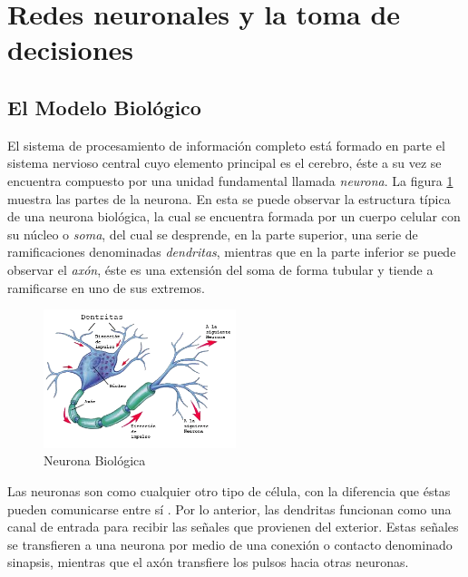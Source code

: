 \section{Redes neuronales y la toma de decisiones}
\subsection{El Modelo Biol\'{o}gico}
 
 		El sistema de procesamiento de informaci\'{o}n completo est\'{a} formado en parte el
 	sistema nervioso central cuyo elemento principal es el cerebro, \'{e}ste a su
 	vez se encuentra compuesto por una unidad fundamental llamada \textit{neurona}.
 	\cite{Kriesel2005} La figura \ref{fig:neuronaBio} muestra las partes de la
 	neurona. En esta se puede observar la estructura t\'{i}pica de una neurona biol\'{o}gica, la
 	cual se encuentra formada por un cuerpo celular con su n\'{u}cleo o
 	\textit{soma}, del cual se desprende, en la parte superior, una serie de
 	ramificaciones denominadas \textit{dendritas}, mientras que en la parte
 	inferior se puede observar el \textit{ax\'{o}n}, \'{e}ste es una extensi\'{o}n del soma de forma tubular y
 	tiende a ramificarse en uno de sus extremos.
 	
 	\begin{figure}[htp]
 		\centering
 		\includegraphics[width=0.5\textwidth]{images/TesisYGR-neuron.png}
 		\caption{Neurona Biol\'{o}gica}
 		\label{fig:neuronaBio}
 	\end{figure}
 	
 	 		Las neuronas son como cualquier otro tipo de c\'{e}lula, con la diferencia que
 	\'{e}stas pueden comunicarse entre s\'{i} \cite{Longo2011}. Por lo anterior, las dendritas
 	funcionan como una canal de entrada para recibir las se\~{n}ales que provienen del
 	exterior. Estas se\~{n}ales se transfieren a una neurona por medio de una conexi\'{o}n o contacto denominado sinapsis, mientras que el ax\'{o}n transfiere los pulsos hacia otras neuronas.

